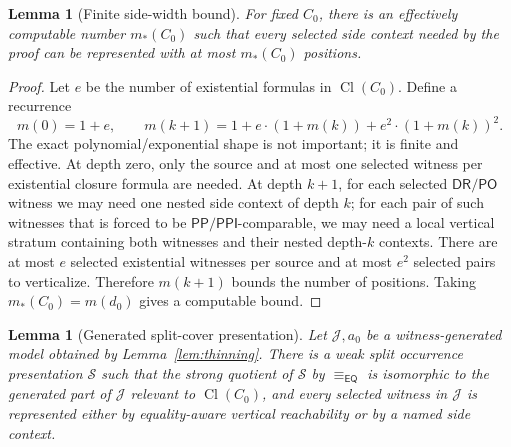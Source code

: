 \documentclass[11pt]{article}
\newtheorem{lemma}[theorem]{Lemma}
\newcommand{\EQ}{\mathsf{EQ}}
\newcommand{\DR}{\mathsf{DR}}
\newcommand{\PO}{\mathsf{PO}}
\newcommand{\PP}{\mathsf{PP}}
\newcommand{\PPI}{\mathsf{PPI}}
\newcommand{\Cl}{\operatorname{Cl}}
\newcommand{\J}{\mathcal J}
\newcommand{\eqc}{\equiv_{\EQ}}
\begin{document}
\begin{lemma}[Finite side-width bound]\label{lem:side-width}
For fixed $C_0$, there is an effectively computable number $m_*(C_0)$ such that every selected side context needed by the proof can be represented with at most $m_*(C_0)$ positions.
\end{lemma}

\begin{proof}
Let $e$ be the number of existential formulas in $\Cl(C_0)$.  Define a recurrence
\[
  m(0)=1+e,
  \qquad
  m(k+1)=1+e\cdot(1+m(k))+e^2\cdot(1+m(k))^2.
\]
The exact polynomial/exponential shape is not important; it is finite and effective.  At depth zero, only the source and at most one selected witness per existential closure formula are needed.  At depth $k+1$, for each selected $\DR/\PO$ witness we may need one nested side context of depth $k$; for each pair of such witnesses that is forced to be $\PP/\PPI$-comparable, we may need a local vertical stratum containing both witnesses and their nested depth-$k$ contexts.  There are at most $e$ selected existential witnesses per source and at most $e^2$ selected pairs to verticalize.  Therefore $m(k+1)$ bounds the number of positions.  Taking $m_*(C_0)=m(d_0)$ gives a computable bound.
\end{proof}

\begin{lemma}[Generated split-cover presentation]\label{lem:split-cover}
Let $\J,a_0$ be a witness-generated model obtained by Lemma~\ref{lem:thinning}.  There is a weak split occurrence presentation $\mathcal S$ such that the strong quotient of $\mathcal S$ by $\eqc$ is isomorphic to the generated part of $\J$ relevant to $\Cl(C_0)$, and every selected witness in $\J$ is represented either by equality-aware vertical reachability or by a named side context.
\end{lemma}
\end{document}

